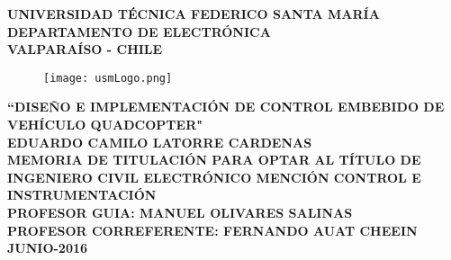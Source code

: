 \documentclass[\main/main.tex]{subfiles}
\begin{document}
	\thispagestyle{empty}
	\begin{center}
		\linespread{1.15}
		\textbf{
			\large{UNIVERSIDAD TÉCNICA FEDERICO SANTA MARÍA\\}
			\normalsize{DEPARTAMENTO DE ELECTRÓNICA\\VALPARAÍSO - CHILE\\}
			}		
		\vspace{0.5cm}
		\begin{figure}[H]
			\centering
			\texttt{[image: usmLogo.png]}
		\end{figure}
		\vspace{0.5cm}
		\linespread{1}\hangindent=0cm
		\textbf{
			\Large “DISEÑO E IMPLEMENTACIÓN DE CONTROL EMBEBIDO DE VEHÍCULO QUADCOPTER"
			}\\
		\vspace{3cm}
		\hangindent=0cm\large \textbf{
			EDUARDO CAMILO LATORRE CARDENAS
			}\\
		\vspace{0.5cm}
		\hangindent=0cm\normalsize \textbf{
			MEMORIA DE TITULACIÓN PARA OPTAR AL TÍTULO DE INGENIERO CIVIL ELECTRÓNICO MENCIÓN CONTROL E INSTRUMENTACIÓN
			}\\
		\vspace{1cm}
		\hangindent=0cm\normalsize \textbf{
			PROFESOR GUIA: \hspace{2cm} MANUEL OLIVARES SALINAS
			}\\
		\vspace{0.5cm}
		\hangindent=0cm\normalsize \textbf{
			PROFESOR CORREFERENTE: \hspace{2cm} FERNANDO AUAT CHEEIN
			}\\
		\vspace{0.5cm}
		\hangindent=0cm\large \textbf{JUNIO-2016}\\		
	\end{center}
	\newpage
\end{document}
